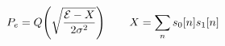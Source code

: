 \documentclass[preview]{standalone}
\begin{document}
\begin{align*}
\special{dvisvgm:raw <g id='unique000'>}P_e=Q\!\left(\sqrt{\frac{\mathcal E-X}{2\sigma^2}}\right)\qquad X=\sum_n s_0[n]s_1[n]\special{dvisvgm:raw </g>}
\end{align*}
\end{document}
